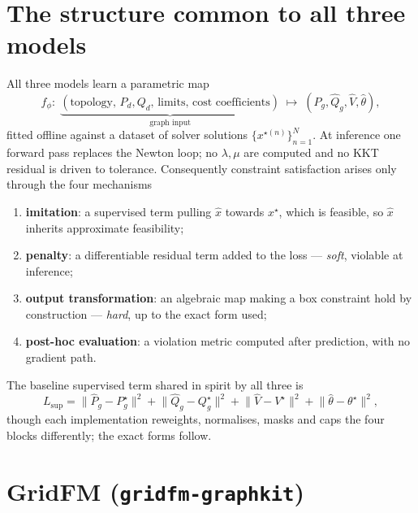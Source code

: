 \documentclass[11pt]{article}
\newcommand{\pred}[1]{\widehat{#1}}
\newcommand{\code}[1]{\texttt{\small #1}}
\begin{document}
\section{The structure common to all three models}
\label{sec:common}

All three models learn a parametric map
\begin{equation}
f_\phi:\;\underbrace{(\text{topology},\,P_d,Q_d,\,\text{limits},\,\text{cost coefficients})}_{\text{graph input}}
\;\longmapsto\;
(\pred{P}_g,\pred{Q}_g,\pred{V},\pred\theta),
\label{eq:map}
\end{equation}
fitted offline against a dataset of solver solutions $\{x^{\star(n)}\}_{n=1}^{N}$. At
inference one forward pass replaces the Newton loop; no $\lambda,\mu$ are computed and no
KKT residual is driven to tolerance. Consequently constraint satisfaction arises only
through the four mechanisms
\begin{enumerate}
\item \textbf{imitation}: a supervised term pulling $\pred{x}$ towards $x^\star$, which is
      feasible, so $\pred{x}$ inherits approximate feasibility;
\item \textbf{penalty}: a differentiable residual term added to the loss --- \emph{soft},
      violable at inference;
\item \textbf{output transformation}: an algebraic map making a box constraint hold by
      construction --- \emph{hard}, up to the exact form used;
\item \textbf{post-hoc evaluation}: a violation metric computed after prediction, with no
      gradient path.
\end{enumerate}
The baseline supervised term shared in spirit by all three is
\begin{equation}
L_{\mathrm{sup}}
=\big\|\pred{P}_g-P_g^\star\big\|^2
+\big\|\pred{Q}_g-Q_g^\star\big\|^2
+\big\|\pred{V}-V^\star\big\|^2
+\big\|\pred\theta-\theta^\star\big\|^2 ,
\label{eq:sup}
\end{equation}
though each implementation reweights, normalises, masks and caps the four blocks
differently; the exact forms follow.

\section{GridFM (\code{gridfm-graphkit})}
\label{sec:gridfm}
\end{document}
